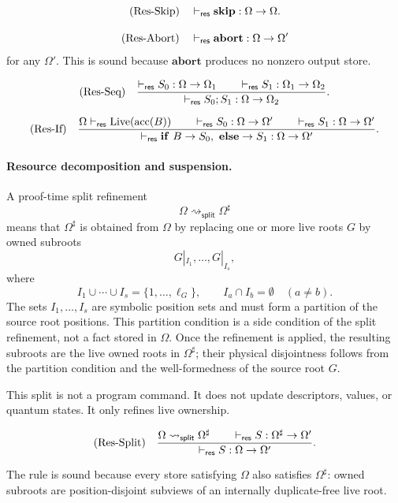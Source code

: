 \documentclass[acmsmall,screen,review,anonymous,nonacm]{acmart}
\theoremstyle{defn_style}
\begin{document}
\[
\text{\rm (Res-Skip)}
\quad
\vdash_{\mathsf{res}}\mathbf{skip}:\Omega\rightarrow\Omega .
\]

\[
\text{\rm (Res-Abort)}
\quad
\vdash_{\mathsf{res}}\mathbf{abort}: \Omega\rightarrow\Omega'
\]
for any \(\Omega'\). This is sound because \(\mathbf{abort}\) produces no
nonzero output store.

\[
\text{\rm (Res-Seq)}
\quad
\frac{
\vdash_{\mathsf{res}}S_0: \Omega\rightarrow\Omega_1
\qquad
\vdash_{\mathsf{res}}S_1: \Omega_1\rightarrow\Omega_2
}{
\vdash_{\mathsf{res}}S_0;S_1: \Omega\rightarrow\Omega_2
}.
\]

\[
\text{\rm ({Res-If})}
\quad
\frac{
\Omega\vdash_{\mathsf{res}}\operatorname{Live}(\operatorname{acc}(B))
\qquad
\vdash_{\mathsf{res}}S_0:\Omega\rightarrow\Omega'
\qquad
\vdash_{\mathsf{res}}S_1:\Omega\rightarrow\Omega'
}{
\vdash_{\mathsf{res}}
\mathbf{if}\ B\rightarrow S_0,\ \mathbf{else}\rightarrow S_1
:\Omega\rightarrow\Omega'
}.
\]

\paragraph{Resource decomposition and suspension.}

A proof-time split refinement
\[
\Omega\rightsquigarrow_{\mathsf{split}}\Omega^\sharp
\]
means that \(\Omega^\sharp\) is obtained from \(\Omega\) by replacing one or
more live roots \(G\) by owned subroots
\[
G|_{I_1},\ldots,G|_{I_s},
\]
where
\[
I_1\cup\cdots\cup I_s=\{1,\ldots,\ell_G\},
\qquad
I_a\cap I_b=\emptyset\quad(a\ne b).
\]
The sets \(I_1,\ldots,I_s\) are symbolic position sets and must form a
partition of the source root positions. This partition condition is a
side condition of the split refinement, not a fact stored in
\(\Omega\). Once the refinement is applied, the resulting subroots are
the live owned roots in \(\Omega^\sharp\); their physical disjointness
follows from the partition condition and the well-formedness of the
source root \(G\).

This split is not a program command. It does not update descriptors, values,
or quantum states. It only refines live ownership.

\[
\text{\rm (Res-Split)}
\quad
\frac{
\Omega\rightsquigarrow_{\mathsf{split}}\Omega^\sharp
\qquad
\vdash_{\mathsf{res}}S:\Omega^\sharp\rightarrow\Omega'
}{
\vdash_{\mathsf{res}}S:\Omega\rightarrow\Omega'
}.
\]

The rule is sound because every store satisfying \(\Omega\) also satisfies
\(\Omega^\sharp\): owned subroots are position-disjoint subviews of an
internally duplicate-free live root.
\end{document}
